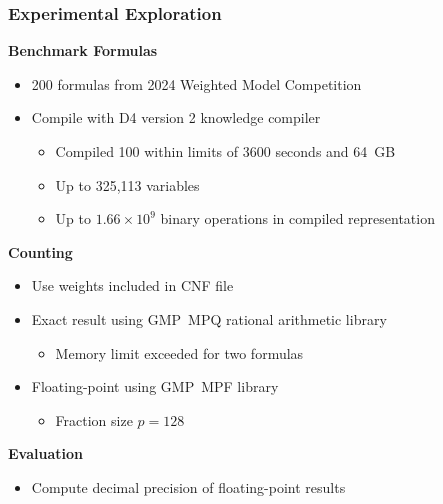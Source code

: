 \documentclass[t,pdf]{beamer}
\newcommand{\bitem}{\item[$\bullet$]}
\begin{document}
\begin{frame}
  \frametitle{Experimental Exploration}

\medskip  

  \textbf{Benchmark Formulas}
  \begin{itemize}
  \item 200 formulas from 2024 Weighted Model Competition
  \item Compile with D4 version 2 knowledge compiler
    \begin{itemize}
    \bitem Compiled 100 within limits of 3600 seconds and 64~GB
    \bitem Up to 325,113 variables
    \bitem Up to $1.66\times 10^9$ binary operations in compiled representation
    \end{itemize}
  \end{itemize}

\medskip

    \textbf{Counting}
    \begin{itemize}
    \item Use weights included in CNF file
    \item Exact result using GMP~MPQ rational arithmetic library
      \begin{itemize}
       \bitem Memory limit exceeded for two formulas
      \end{itemize}
    \item Floating-point using GMP~MPF  library
      \begin{itemize}
       \bitem Fraction size $p = 128$
      \end{itemize}
    \end{itemize}

\medskip

  \textbf{Evaluation}
  \begin{itemize}
  \item Compute decimal precision of floating-point results
  \end{itemize}

\end{frame}
\end{document}
